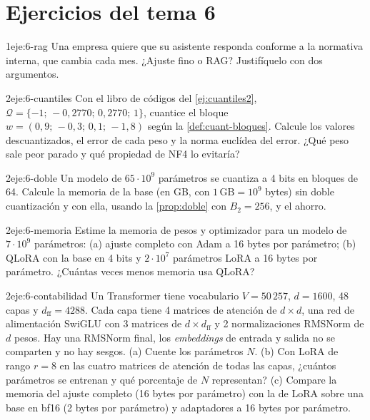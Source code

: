 \section*{Ejercicios del tema 6}

\begin{ejercicio}{1}{eje:6-rag}
Una empresa quiere que su asistente responda conforme a la normativa interna, que cambia cada mes. ¿Ajuste fino o RAG? Justifíquelo con dos argumentos.
\end{ejercicio}

\begin{ejercicio}{2}{eje:6-cuantiles}
Con el libro de códigos del \cref{ej:cuantiles2}, $\mathcal{Q}=\{-1;\,-0{,}2770;\,0{,}2770;\,1\}$, cuantice el bloque $w=(0{,}9;\,-0{,}3;\,0{,}1;\,-1{,}8)$ según la \cref{def:cuant-bloques}. Calcule los valores descuantizados, el error de cada peso y la norma euclídea del error. ¿Qué peso sale peor parado y qué propiedad de NF4 lo evitaría?
\end{ejercicio}

\begin{ejercicio}{2}{eje:6-doble}
Un modelo de $65\cdot 10^{9}$ parámetros se cuantiza a 4 bits en bloques de 64. Calcule la memoria de la base (en GB, con $1\,\mathrm{GB}=10^{9}$ bytes) sin doble cuantización y con ella, usando la \cref{prop:doble} con $B_2=256$, y el ahorro.
\end{ejercicio}

\begin{ejercicio}{2}{eje:6-memoria}
Estime la memoria de pesos y optimizador para un modelo de $7\cdot 10^{9}$ parámetros: (a) ajuste completo con Adam a 16 bytes por parámetro; (b) QLoRA con la base en 4 bits y $2\cdot 10^{7}$ parámetros LoRA a 16 bytes por parámetro. ¿Cuántas veces menos memoria usa QLoRA?
\end{ejercicio}

\begin{ejercicio}{2}{eje:6-contabilidad}
Un Transformer tiene vocabulario $V=50\,257$, $d=1600$, 48 capas y $d_{\mathrm{ff}}=4288$. Cada capa tiene 4 matrices de atención de $d\times d$, una red de alimentación SwiGLU con 3 matrices de $d\times d_{\mathrm{ff}}$ y 2 normalizaciones RMSNorm de $d$ pesos. Hay una RMSNorm final, los \emph{embeddings} de entrada y salida no se comparten y no hay sesgos. (a) Cuente los parámetros $N$. (b) Con LoRA de rango $r=8$ en las cuatro matrices de atención de todas las capas, ¿cuántos parámetros se entrenan y qué porcentaje de $N$ representan? (c) Compare la memoria del ajuste completo (16 bytes por parámetro) con la de LoRA sobre una base en bf16 (2 bytes por parámetro) y adaptadores a 16 bytes por parámetro.
\end{ejercicio}

